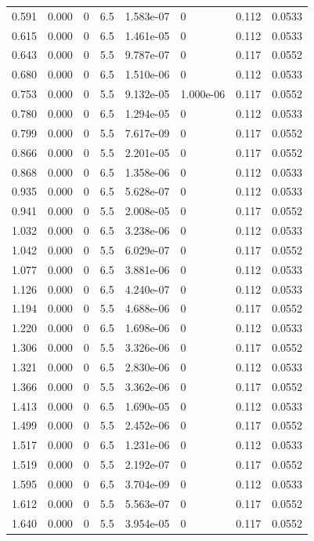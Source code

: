 \documentclass[preview]{standalone}
\begin{document}
{{\begin{tabular}{L{1.2cm}C{1.2cm} C{0.3cm}C{0.5cm} C{1.4cm}C{1.4cm} C{1.4cm}C{1.4cm}}
  0.591  &  0.000  & 0     & 6.5 &  1.583e-07  & 0  & 0.112 &  0.0533   \\ 
  0.615  &  0.000  & 0     & 6.5 &  1.461e-05  & 0  & 0.112 &  0.0533   \\ 
  0.643  &  0.000  & 0     & 5.5 &  9.787e-07  & 0  & 0.117 &  0.0552   \\ 
  0.680  &  0.000  & 0     & 6.5 &  1.510e-06  & 0  & 0.112 &  0.0533   \\ 
  0.753  &  0.000  & 0     & 5.5 &  9.132e-05  & 1.000e-06  & 0.117 &  0.0552   \\ 
  0.780  &  0.000  & 0     & 6.5 &  1.294e-05  & 0  & 0.112 &  0.0533   \\ 
  0.799  &  0.000  & 0     & 5.5 &  7.617e-09  & 0  & 0.117 &  0.0552   \\ 
  0.866  &  0.000  & 0     & 5.5 &  2.201e-05  & 0  & 0.117 &  0.0552   \\ 
  0.868  &  0.000  & 0     & 6.5 &  1.358e-06  & 0  & 0.112 &  0.0533   \\ 
  0.935  &  0.000  & 0     & 6.5 &  5.628e-07  & 0  & 0.112 &  0.0533   \\ 
  0.941  &  0.000  & 0     & 5.5 &  2.008e-05  & 0  & 0.117 &  0.0552   \\ 
  1.032  &  0.000  & 0     & 6.5 &  3.238e-06  & 0  & 0.112 &  0.0533   \\ 
  1.042  &  0.000  & 0     & 5.5 &  6.029e-07  & 0  & 0.117 &  0.0552   \\ 
  1.077  &  0.000  & 0     & 6.5 &  3.881e-06  & 0  & 0.112 &  0.0533   \\ 
  1.126  &  0.000  & 0     & 6.5 &  4.240e-07  & 0  & 0.112 &  0.0533   \\ 
  1.194  &  0.000  & 0     & 5.5 &  4.688e-06  & 0  & 0.117 &  0.0552   \\ 
  1.220  &  0.000  & 0     & 6.5 &  1.698e-06  & 0  & 0.112 &  0.0533   \\ 
  1.306  &  0.000  & 0     & 5.5 &  3.326e-06  & 0  & 0.117 &  0.0552   \\ 
  1.321  &  0.000  & 0     & 6.5 &  2.830e-06  & 0  & 0.112 &  0.0533   \\ 
  1.366  &  0.000  & 0     & 5.5 &  3.362e-06  & 0  & 0.117 &  0.0552   \\ 
  1.413  &  0.000  & 0     & 6.5 &  1.690e-05  & 0  & 0.112 &  0.0533   \\ 
  1.499  &  0.000  & 0     & 5.5 &  2.452e-06  & 0  & 0.117 &  0.0552   \\ 
  1.517  &  0.000  & 0     & 6.5 &  1.231e-06  & 0  & 0.112 &  0.0533   \\ 
  1.519  &  0.000  & 0     & 5.5 &  2.192e-07  & 0  & 0.117 &  0.0552   \\ 
  1.595  &  0.000  & 0     & 6.5 &  3.704e-09  & 0  & 0.112 &  0.0533   \\ 
  1.612  &  0.000  & 0     & 5.5 &  5.563e-07  & 0  & 0.117 &  0.0552   \\ 
  1.640  &  0.000  & 0     & 5.5 &  3.954e-05  & 0  & 0.117 &  0.0552   \\ 
\hline 
\end{tabular} 

}}
\end{document}
